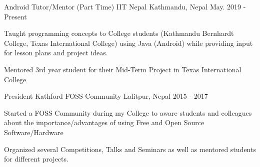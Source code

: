 \begin{cventries}

  \cventry
    {Android Tutor/Mentor (Part Time)} %
    {IIT Nepal} %
    {Kathmandu, Nepal} %
    {May. 2019 - Present} %
    {
      \begin{cvitems} %
        \item {Taught programming concepts to College students (Kathmandu Bernhardt College, Texas International College) using Java (Android) while providing input for lesson plans and project ideas.}
        \item {Mentored 3rd year student for their Mid-Term Project in Texas International College}
      \end{cvitems}
    }
    
  \cventry
    {President} %
    {Kathford FOSS Community} %
    {Lalitpur, Nepal} %
    {2015 - 2017} %
    {
      \begin{cvitems} %
        \item {Started a FOSS Community during my College to aware students and colleagues about the importance/advantages of using Free and Open Source Software/Hardware}
        \item {Organized several Competitions, Talks and Seminars as well as mentored students for different projects.}
      \end{cvitems}
    }
\end{cventries}
